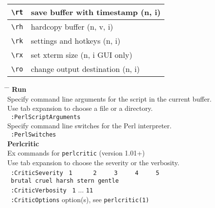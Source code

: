 \documentclass[oneside,10pt,landscape,DIV17]{scrartcl}
\begin{document}
\begin{multicols}{2}
\begin{tabular}[]{|p{11mm}|p{61mm}|}
\hline \verb'\rt'    & save buffer with timestamp               \hfill (n, i)   \\
\hline \verb'\rh'    & hardcopy buffer                          \hfill (n, v, i)\\
\hline \verb'\rk'    & settings and hotkeys                     \hfill (n, i)   \\
\hline \verb'\rx'    & set xterm size                           \hfill (n, i {\tiny GUI only})\\
\hline \verb'\ro'    & change output destination                \hfill (n, i)   \\
\hline
\end{tabular}%
%

\parbox[t][70mm][t]{120mm}{%
%
\begin{tabbing}
\hspace{30mm} \= \hspace{50mm} \= \kill
%
\large{\textbf{Run}}\\[1.0ex]
%
Specify command line arguments for the script in the current buffer.\\
Use tab expansion to choose a file or a directory.\\[1.0ex]
%
\texttt{ :PerlScriptArguments}  \> \\[1.0ex]
%
Specify command line switches for the Perl interpreter.\\[1.0ex]
%
\texttt{ :PerlSwitches}  \> \\[2.5ex]
%
%
\large{\textbf{Perlcritic}}\\[1.0ex]
%
Ex commands for \texttt{perlcritic} (version 1.01+)\\
Use tab expansion to choose the severity or the verbosity.\\[2.0ex]
\texttt{ :CriticSeverity}  \> \texttt{\ 1\ \ \ \ \ \ 2\ \ \ \ \ 3\ \ \ \ \ 4\ \ \ \ \ 5} \\
                           \> \texttt{\ brutal cruel harsh stern gentle} \\[1.0ex]
\texttt{ :CriticVerbosity} \> \texttt{\ 1} $\ldots$ \texttt{11}\\[1.0ex]
\texttt{ :CriticOptions}   \> option(s), see \texttt{perlcritic(1)}\\[2.5ex]

\end{tabbing}}
\end{multicols}
\end{document}
